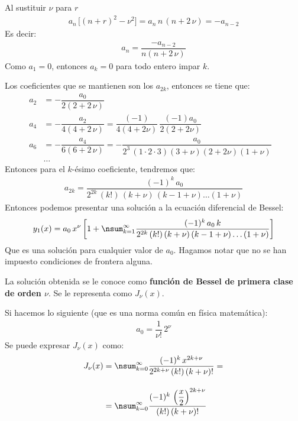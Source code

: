 Al sustituir $\nu$ para $r$
\begin{align*}
a_{n} \, \big[ (n + r)^{2} - \nu^{2} \big] = a_{n} \, n \, (n + 2 \, \nu) = - a_{n-2}
\end{align*}
Es decir:
\begin{align*}
a_{n} = \dfrac{- a_{n-2}}{n (n + 2 \, \nu)}
\end{align*}
Como $a_{1} = 0$, entonces $a_{k} = 0$ para todo entero impar $k$.
\par
Los coeficientes que se mantienen son los $a_{2 k}$, entonces se tiene que:
\begin{align*}
a_{2} &= - \dfrac{a_{0}}{2 (2 + 2 \, \nu)} \\[0.5em]
a_{4} &= - \dfrac{a_{2}}{4 (4 + 2 \, \nu)} = \dfrac{(-1)}{4 (4 + 2 \nu)} \, \dfrac{(-1)a_{0}}{2 (2 + 2 \nu)} \\[0.5em]
a_{6} &= - \dfrac{a_{4}}{6 (6 + 2 \, \nu)} = - \dfrac{a_{0}}{2^{3} \, (1 \cdot 2 \cdot 3) (3 + \nu)(2 + 2 \nu)(1 + \nu)}\\
&\ldots&
\end{align*}
Entonces para el $k$-ésimo coeficiente, tendremos que:
\begin{align*}
a_{2k} = \dfrac{(-1)^{k} \, a_{0}}{2^{2 k} \, (k!) \, (k + \nu) \, (k - 1 + \nu) \ldots (1 + \nu)}
\end{align*}
Entonces podemos presentar una solución a la ecuación diferencial de Bessel:
\begin{align*}
y_{1}(x) = a_{0} \, x^{\nu} \left[ 1 + \nsum_{k=1}^{\infty} \dfrac{(-1)^{k} \, a_{0} \, k}{2^{2 k} \, (k!) \, (k + \nu) \, (k -1 + \nu)\ldots (1 + \nu)} \right]
\end{align*}
Que es una solución para cualquier valor de $a_{0}$. Hagamos notar que no se han impuesto condiciones de frontera alguna.
\par
La solución obtenida se le conoce como \textbf{función de Bessel de primera clase de orden $\nu$}. Se le representa como $J_{\nu} (x)$.
\par
Si hacemos lo siguiente (que es una norma común en física matemática):
\begin{align*}
a_{0} = \dfrac{1}{\nu!} \, 2^{\nu}
\end{align*}
Se puede expresar $J_{\nu} (x)$ como:
\begin{align*}
J_{\nu} (x) &= \nsum_{k=0}^{\infty} \dfrac{(-1)^{k} \, x^{2k+\nu}}{2^{2k+\nu} \, (k!) \, (k + \nu)!} = \\[1em]
&= \nsum_{k=0}^{\infty} \dfrac{(-1)^{k} \, \left( \dfrac{x}{2}\right)^{2k+\nu}}{(k!) \, (k + \nu)!}
\end{align*}
